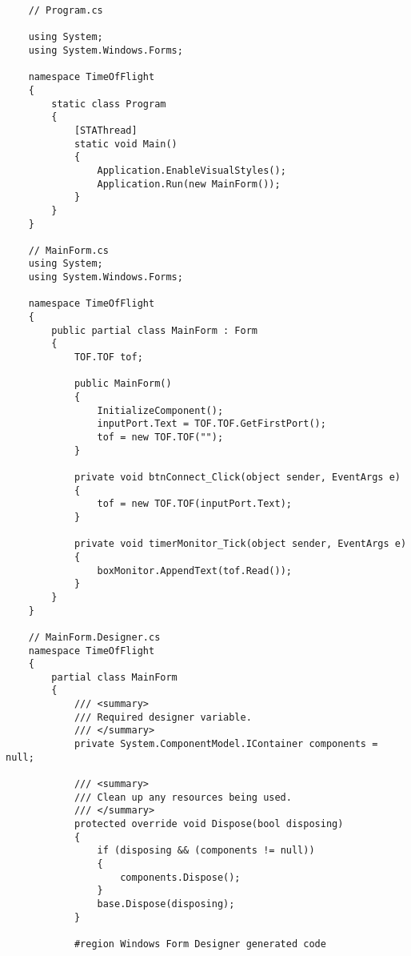 \begin{verbatim}
    // Program.cs

    using System;
    using System.Windows.Forms;

    namespace TimeOfFlight
    {
        static class Program
        {
            [STAThread]
            static void Main()
            {
                Application.EnableVisualStyles();
                Application.Run(new MainForm());
            }
        }
    }

    // MainForm.cs
    using System;
    using System.Windows.Forms;

    namespace TimeOfFlight
    {
        public partial class MainForm : Form
        {
            TOF.TOF tof;

            public MainForm()
            {
                InitializeComponent();
                inputPort.Text = TOF.TOF.GetFirstPort();
                tof = new TOF.TOF("");
            }

            private void btnConnect_Click(object sender, EventArgs e)
            {
                tof = new TOF.TOF(inputPort.Text);
            }

            private void timerMonitor_Tick(object sender, EventArgs e)
            {
                boxMonitor.AppendText(tof.Read());
            }
        }
    }

    // MainForm.Designer.cs
    namespace TimeOfFlight
    {
        partial class MainForm
        {
            /// <summary>
            /// Required designer variable.
            /// </summary>
            private System.ComponentModel.IContainer components = null;

            /// <summary>
            /// Clean up any resources being used.
            /// </summary>
            protected override void Dispose(bool disposing)
            {
                if (disposing && (components != null))
                {
                    components.Dispose();
                }
                base.Dispose(disposing);
            }

            #region Windows Form Designer generated code


\end{verbatim}
